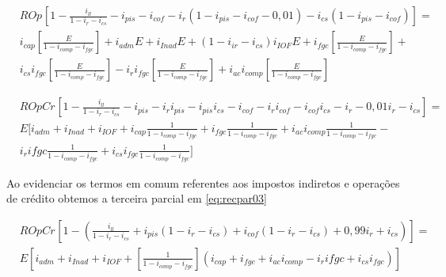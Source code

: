\documentclass[
  12pt,
  12pt,
  openright,
  oneside,
  a4paper,
  chapter=TITLE,
  section=TITLE,
  subsection=TITLE,
  subsubsection=TITLE,
  english,
  portugues,
  sumario=tradicional]{abntex2}
\begin{document}
\begin{apendicesenv}
\begin{equation}\label{eq:decrec2}
\begin{aligned}
& ROp_{} \left[ 1 - \frac{i_{ll}}{1 - i_{r} - i_{cs}} - i_{pis} - i_{cof} - i_{r} (1-i_{pis} - i_{cof} - 0,01) - i_{cs} (1-i_{pis} - i_{cof}) \right] = \\
& i_{cap} \left[ \frac{E}{1 - i_{comp} - i_{fgc}} \right] + i_{adm}E + i_{Inad}E + (1 - i_{ir} - i_{cs})i_{IOF}E + i_{fgc} \left[ \frac{E}{1 - i_{comp} - i_{fgc}} \right] + \\ & i_{cs}i_{fgc}\left[\frac{E}{1 - i_{comp} - i_{fgc}}\right] - 
i_{r}i_{fgc}\left[\frac{E}{1 - i_{comp} - i_{fgc}}\right] + i_{ac}i_{comp}\left[\frac{E}{1 - i_{comp} - i_{fgc}}\right]
\end{aligned}
\end{equation}




\begin{equation}\label{eq:recpar02}
\begin{aligned}
& ROpCr_{}\left[ 1 - \frac{i_{ll}}{1 - i_{r} - i_{cs}} - i_{pis} - i_{r}i_{pis} - i_{pis}i_{cs} - i_{cof} - i_{r}i_{cof} - i_{cof}i_{cs} - i_{r} - 0,01i_{r} - i_{cs}\right] = \\
& E [ i_{adm} + i_{Inad} + i_{IOF} +  i_{cap}\frac{1}{1 - i_{comp} - i_{fgc}} + i_{fgc}\frac{1}{1 - i_{comp} - i_{fgc}} + i_{ac}i_{comp}\frac{1}{1 - i_{comp} - i_{fgc}} - \\
& i_{r}i{fgc}\frac{1}{1 - i_{comp} - i_{fgc}} + i_{cs}i_{fgc}\frac{1}{1 - i_{comp} - i_{fgc}} ]
\end{aligned}
\end{equation}


Ao evidenciar os termos em comum referentes aos impostos indiretos e operações de crédito obtemos a terceira parcial em \autoref{eq:recpar03}



\begin{equation}\label{eq:recpar03}
\begin{aligned}
& ROpCr_{}\left[1 - (\frac{i_{ll}}{1 - i_{r} - i_{cs}} + i_{pis}(1 - i_{r} - i_{cs}) + i_{cof}(1 - i_{r} - i_{cs}) + 0,99i_{r} + i_{cs})\right] = \\
& E\left[i_{adm} + i_{Inad} + i_{IOF} +  [\frac{1}{1 - i_{comp} - i_{fgc}}] (i_{cap} + i_{fgc} + i_{ac}i_{comp} - i_{r}i{fgc}+ i_{cs}i_{fgc})\right]
\end{aligned}
\end{equation}




\end{apendicesenv}
\end{document}
